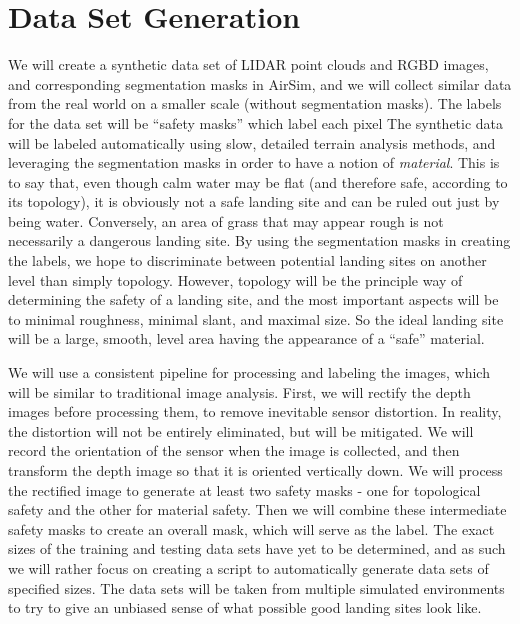 \section{Data Set Generation}
\label{section:dataset_generation}

We will create a synthetic data set of LIDAR point clouds and RGBD images,
and corresponding segmentation masks in AirSim,
and we will collect similar data from the real world on a smaller scale (without segmentation masks).
The labels for the data set will be ``safety masks'' which label each pixel
The synthetic data will be labeled automatically using slow, detailed terrain analysis methods,
and leveraging the segmentation masks in order to have a notion of \textit{material}.
This is to say that, even though calm water may be flat (and therefore safe,
according to its topology),
it is obviously not a safe landing site and can be ruled out just by being water.
Conversely, an area of grass that may appear rough is not necessarily a dangerous landing site.
By using the segmentation masks in creating the labels,
we hope to discriminate between potential landing sites on another level than simply topology.
However, topology will be the principle way of determining the safety of a landing site,
and the most important aspects will be to minimal roughness, minimal slant, and maximal size.
So the ideal landing site will be a large, smooth, level area
having the appearance of a ``safe'' material.

We will use a consistent pipeline for processing and labeling the images,
which will be similar to traditional image analysis.
First, we will rectify the depth images before processing them,
to remove inevitable sensor distortion.
In reality, the distortion will not be entirely eliminated, but will be mitigated.
We will record the orientation of the sensor when the image is collected,
and then transform the depth image so that it is oriented vertically down.
We will process the rectified image to generate at least two safety masks -
one for topological safety and the other for material safety.
Then we will combine these intermediate safety masks to create an overall mask,
which will serve as the label.
The exact sizes of the training and testing data sets have yet to be determined, and as such we will rather focus
on creating a script to automatically generate data sets of specified sizes.
The data sets will be taken from multiple simulated environments to try to give an unbiased
sense of what possible good landing sites look like.

